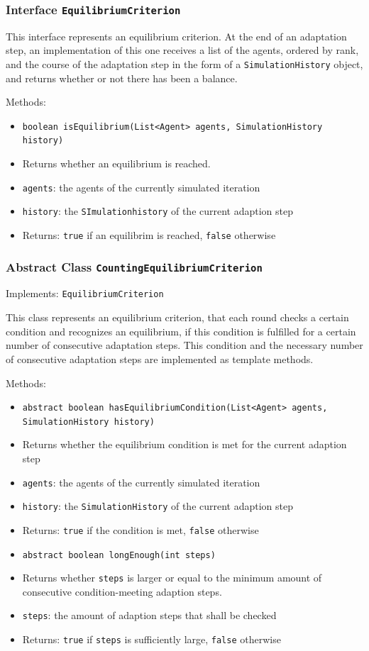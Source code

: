 \documentclass[parskip=full,11pt]{scrartcl}
\begin{document}
\subsubsection{Interface \texttt{EquilibriumCriterion}}

This interface represents an equilibrium criterion. At the end of an adaptation step, an implementation of this one receives a list of the agents, ordered by rank, and the course of the adaptation step in the form of a \texttt{SimulationHistory} object, and returns whether or not there has been a balance.

Methods:
\begin{itemize}\itemsep -10pt
\item \texttt{boolean isEquilibrium(List<Agent> agents, SimulationHistory history)}
\item[] Returns whether an equilibrium is reached.
\item[] \texttt{agents}: the agents of the currently simulated iteration
\item[] \texttt{history}: the \texttt{SImulationhistory} of the current adaption step
\item[] Returns: \texttt{true} if an equilibrim is reached, \texttt{false} otherwise
\end{itemize}

\subsubsection{Abstract Class \texttt{CountingEquilibriumCriterion}}
Implements: \texttt{EquilibriumCriterion}

This class represents an equilibrium criterion, that each round checks a certain condition and recognizes an equilibrium, if this condition is fulfilled for a certain number of consecutive adaptation steps. This condition and the necessary number of consecutive adaptation steps are implemented as template methods.

Methods:
\begin{itemize}\itemsep -10pt
\item \texttt{abstract boolean hasEquilibriumCondition(List<Agent> agents, SimulationHistory history)}
\item[] Returns whether the equilibrium condition is met for the current adaption step
\item[] \texttt{agents}: the agents of the currently simulated iteration
\item[] \texttt{history}: the \texttt{SimulationHistory} of the current adaption step
\item[] Returns: \texttt{true} if the condition is met, \texttt{false} otherwise

\item \texttt{abstract boolean longEnough(int steps)}
\item[] Returns whether \texttt{steps} is larger or equal to the minimum amount of consecutive condition-meeting adaption steps.
\item[] \texttt{steps}: the amount of adaption steps that shall be checked
\item[] Returns: \texttt{true} if \texttt{steps} is sufficiently large, \texttt{false} otherwise
\end{itemize}
\end{document}
